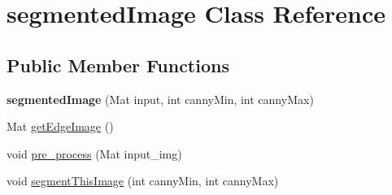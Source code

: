 \hypertarget{classsegmentedImage}{
\section{segmentedImage Class Reference}
\label{classsegmentedImage}
}
\subsection*{Public Member Functions}
\begin{DoxyCompactItemize}
\item 
\hypertarget{classsegmentedImage_ad17cd5d5e484be105efb0046151f314f}{
{\bfseries segmentedImage} (Mat input, int cannyMin, int cannyMax)}
\label{classsegmentedImage_ad17cd5d5e484be105efb0046151f314f}

\item 
Mat \hyperlink{classsegmentedImage_a044e9378bc9e068f99b977ce80254f35}{getEdgeImage} ()
\item 
void \hyperlink{classsegmentedImage_a428bdd95c64f3c7b7ef076353a539bd2}{pre\_\-process} (Mat input\_\-img)
\item 
void \hyperlink{classsegmentedImage_a8d6fd64835f0852e3cdd6658ab2d92bf}{segmentThisImage} (int cannyMin, int cannyMax)
\end{DoxyCompactItemize}


